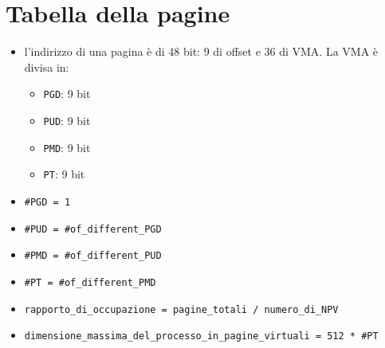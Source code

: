 \documentclass[12pt, a4paper]{report}
\begin{document}
\newpage
\section*{Tabella della pagine}
\begin{itemize}
	\item l'indirizzo di una pagina è di 48 bit: 9 di offset e 36 di VMA. La
		VMA è divisa in:
		\begin{itemize}
			\item \texttt{PGD}: 9 bit
			\item \texttt{PUD}: 9 bit
			\item \texttt{PMD}: 9 bit
			\item \texttt{PT}: 9 bit
		\end{itemize}
	\item \texttt{\#PGD = 1}
	\item \texttt{\#PUD = \#of\_different\_PGD}
	\item \texttt{\#PMD = \#of\_different\_PUD}
	\item \texttt{\#PT = \#of\_different\_PMD}
	\item \texttt{rapporto\_di\_occupazione = pagine\_totali / numero\_di\_NPV}
	\item \texttt{dimensione\_massima\_del\_processo\_in\_pagine\_virtuali =
		512 * \#PT}
\end{itemize}
\end{document}
